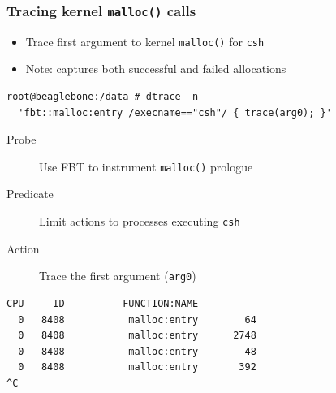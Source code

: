 \begin{frame}[fragile]
  \frametitle{Tracing kernel \texttt{malloc()} calls}

  \begin{itemize}
    \item Trace first argument to kernel \texttt{malloc()} for \texttt{csh}
    \item Note: captures both successful and failed allocations
  \end{itemize}

  \begin{small}
\begin{verbatim}
root@beaglebone:/data # dtrace -n
  'fbt::malloc:entry /execname=="csh"/ { trace(arg0); }'
\end{verbatim}
  \end{small}

  \begin{description}
    \item[Probe] Use FBT to instrument \texttt{malloc()} prologue
    \item[Predicate] Limit actions to processes executing \texttt{csh}
    \item[Action] Trace the first argument (\texttt{arg0})
  \end{description}

  \pause

  \begin{small}
\begin{verbatim}
CPU     ID          FUNCTION:NAME
  0   8408           malloc:entry        64
  0   8408           malloc:entry      2748
  0   8408           malloc:entry        48
  0   8408           malloc:entry       392
^C
\end{verbatim}
  \end{small}
\end{frame}

